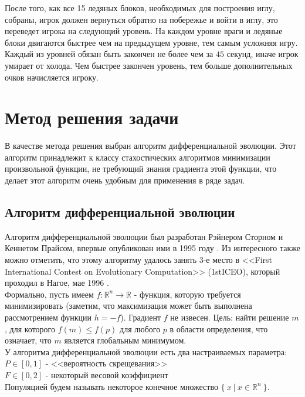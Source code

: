 \documentclass[12pt]{article}
\begin{document}
    После того, как все 15 ледяных блоков, необходимых для построения иглу, собраны, игрок должен вернуться обратно на побережье и войти в иглу, это переведет игрока на следующий уровень. На каждом уровне враги и ледяные блоки двигаются быстрее чем на предыдущем уровне, тем самым усложняя игру. \\

    Каждый из уровней обязан быть закончен не более чем за $45$ секунд, иначе игрок умирает от холода. Чем быстрее закончен уровень, тем больше дополнительных очков начисляется игроку.

\section{Метод решения задачи}
    В качестве метода решения выбран алгоритм дифференциальной эволюции. Этот алгоритм принадлежит к классу стахостических алгоритмов минимизации произвольной функции, не требующий знания градиента этой функции, что делает этот алгоритм очень удобным для применения в ряде задач.

    \subsection{Алгоритм дифференциальной эволюции}
        Алгоритм дифференциальной эволюции был разработан Рэйнером Сторном и Кеннетом Прайсом, впервые опубликован ими в 1995 году \cite{DE-1995}. Из интересного также можно отметить, что этому алгоритму удалось занять 3-е место в <<First International Contest on Evolutionary Computation>> (1stICEO), который проходил в Нагое, мае 1996 \cite{DE}. \\

        Формально, пусть имеем $f: \mathbb{R}^{n} \to \mathbb{R}$ - функция, которую требуется минимизировать (заметим, что максимизация может быть выполнена рассмотрением функции $h = -f$). Градиент $f$ не извесен. Цель: найти решение $m$, для которого $f(m) \leq f(p)$ для любого $p$ в области определения, что означает, что $m$ является глобальным минимумом. \\

        У алгоритма дифференциальной эволюции есть два настраиваемых параметра: \\ 
        $P \in [0, 1]$ - <<вероятность скрещевания>> \\
        $F \in [0, 2]$ - некоторый весовой коэффициент \\

        Популяцией будем называть некоторое конечное множество $\{~x~|~x \in \mathbb{R}^n~\}$. \\
\end{document}

